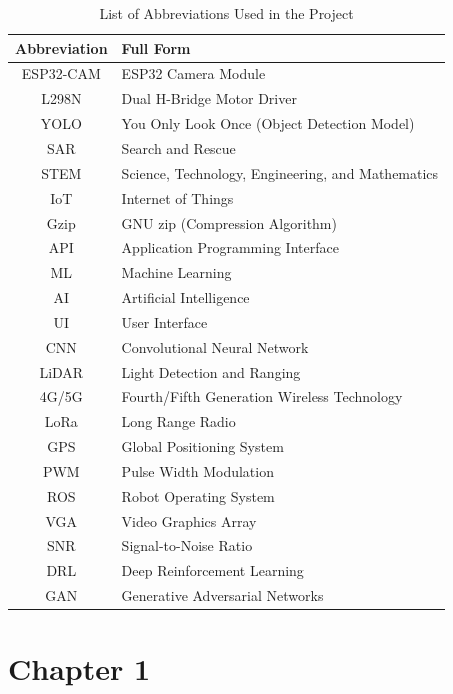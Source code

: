 \documentclass[12pt,a4paper]{report}
\begin{document}
\begin{table}[ht]
\centering
\begin{tabular}{|c|l|}
\hline
\textbf{Abbreviation} & \textbf{Full Form} \\ \hline
ESP32-CAM & ESP32 Camera Module \\ \hline
L298N & Dual H-Bridge Motor Driver \\ \hline
YOLO & You Only Look Once (Object Detection Model) \\ \hline
SAR & Search and Rescue \\ \hline
STEM & Science, Technology, Engineering, and Mathematics \\ \hline
IoT & Internet of Things \\ \hline
Gzip & GNU zip (Compression Algorithm) \\ \hline
API & Application Programming Interface \\ \hline
ML & Machine Learning \\ \hline
AI & Artificial Intelligence \\ \hline
UI & User Interface \\ \hline
CNN & Convolutional Neural Network \\ \hline
LiDAR & Light Detection and Ranging \\ \hline
4G/5G & Fourth/Fifth Generation Wireless Technology \\ \hline
LoRa & Long Range Radio \\ \hline
GPS & Global Positioning System \\ \hline
PWM & Pulse Width Modulation \\ \hline
ROS & Robot Operating System \\ \hline
VGA & Video Graphics Array \\ \hline
SNR & Signal-to-Noise Ratio \\ \hline
DRL & Deep Reinforcement Learning \\ \hline
GAN & Generative Adversarial Networks \\ \hline
\end{tabular}
\caption{List of Abbreviations Used in the Project}
\label{tab:abbreviations}
\end{table}




	\renewcommand{\thesection}{\arabic{section}}
	
	\newpage
	{\vfill \chapter*{\centering \vfill Chapter 1 \vfill}\vfill}
	\thispagestyle{empty}
	\newpage
\end{document}
